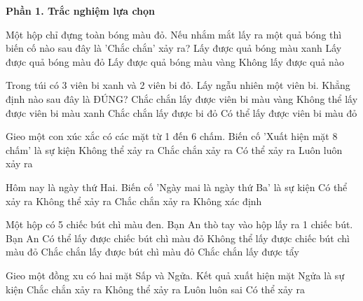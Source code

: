 \textbf{Phần 1. Trắc nghiệm lựa chọn}

\begin{ex} %
Một hộp chỉ đựng toàn bóng màu đỏ. Nếu nhắm mắt lấy ra một quả bóng thì biến cố nào sau đây là 'Chắc chắn' xảy ra?
\choice
{Lấy được quả bóng màu xanh}
{\True Lấy được quả bóng màu đỏ}
{Lấy được quả bóng màu vàng}
{Không lấy được quả nào}
\end{ex}

\begin{ex} %
Trong túi có 3 viên bi xanh và 2 viên bi đỏ. Lấy ngẫu nhiên một viên bi. Khẳng định nào sau đây là ĐÚNG?
\choice
{Chắc chắn lấy được viên bi màu vàng}
{Không thể lấy được viên bi màu xanh}
{Chắc chắn lấy được bi đỏ}
{\True Có thể lấy được viên bi màu đỏ}
\end{ex}

\begin{ex} %
Gieo một con xúc xắc có các mặt từ 1 đến 6 chấm. Biến cố 'Xuất hiện mặt 8 chấm' là sự kiện
\choice
{\True Không thể xảy ra}
{Chắc chắn xảy ra}
{Có thể xảy ra}
{Luôn luôn xảy ra}
\end{ex}

\begin{ex} %
Hôm nay là ngày thứ Hai. Biến cố 'Ngày mai là ngày thứ Ba' là sự kiện
\choice
{Có thể xảy ra}
{Không thể xảy ra}
{\True Chắc chắn xảy ra}
{Không xác định}
\end{ex}

\begin{ex} %
Một hộp có 5 chiếc bút chì màu đen. Bạn An thò tay vào hộp lấy ra 1 chiếc bút. Bạn An
\choice
{Có thể lấy được chiếc bút chì màu đỏ}
{\True Không thể lấy được chiếc bút chì màu đỏ}
{Chắc chắn lấy được bút chì màu đỏ}
{Chắc chắn lấy được tẩy}
\end{ex}

\begin{ex} %
Gieo một đồng xu có hai mặt Sấp và Ngửa. Kết quả xuất hiện mặt Ngửa là sự kiện
\choice
{Chắc chắn xảy ra}
{Không thể xảy ra}
{Luôn luôn sai}
{\True Có thể xảy ra}
\end{ex}


